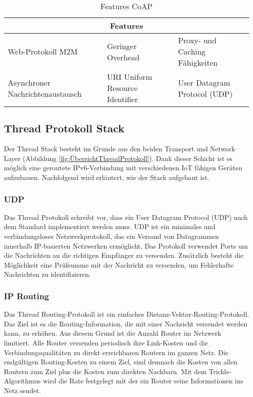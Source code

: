 \begin{table}[H]
	\centering
	\begin{adjustbox}{width=1\textwidth}
		\begin{tabular}{@{}|l|l|l|@{}}
			\toprule
			\multicolumn{3}{|c|}{\textbf{Features}}                                                             \\ \midrule
			Web-Protokoll M2M                & Geringer Overhead               & Proxy- und Caching Fähigkeiten \\ \midrule
			Asynchroner Nachrichtenaustausch & URI Uniform Resource Identifier & User Datagram  Protocol  (UDP) \\ \bottomrule
		\end{tabular}
	\end{adjustbox}
	\caption{Features CoAP}
	\label{table:FeaturesCoAP}
\end{table}
\newpage


\subsection{Thread Protokoll Stack}\label{subsec:ThreadProtokollStack}
Der Thread Stack besteht im Grunde aus den beiden Transport und Network Layer (Abbildung \ref{fig:ÜbersichtThreadProtokoll}). Dank dieser Schicht ist es möglich eine geroutete IPv6-Verbindung mit verschiedenen IoT fähigen Geräten aufzubauen. Nachfolgend wird erläutert, wie der Stack aufgebaut ist.

\subsubsection{UDP}\label{subsubsec:UDP}
Das Thread Protokoll schreibt vor, dass ein User Datagram Protocol (UDP) nach dem Standard \cite{postel_user_1980} implementiert werden muss. UDP ist ein minimales und verbindungsloses Netzwerkprotokoll, das ein Versand von Datagrammen innerhalb IP-basierten Netzwerken ermöglicht. Das Protokoll verwendet Ports um die Nachrichten an die richtigen Empfänger zu versenden. Zusätzlich besteht die Möglichkeit eine Prüfsumme mit der Nachricht zu versenden, um Fehlerhafte Nachrichten zu identifizieren. \cite[Seite 6-2]{thread_group_inc_thread_2017}

\subsubsection{IP Routing}\label{subsubsec:IPRouting}
Das Thread Routing-Protokoll ist ein einfaches Distanz-Vektor-Routing-Protokoll. Das Ziel ist es die Routing-Information, die mit einer Nachricht versendet werden kann, zu erhöhen. Aus diesem Grund ist die Anzahl Router im Netzwerk limitiert. Alle Router versenden periodisch ihre Link-Kosten und die Verbindungsqualitäten zu direkt erreichbaren Routern im ganzen Netz. Die endgültigen Routing-Kosten zu einem Ziel, sind demnach die Kosten von allen Routern zum Ziel plus die Kosten zum direkten Nachbarn. Mit dem Trickle-Algorithmus \cite{levis_trickle_2011} wird die Rate festgelegt mit der ein Router seine Informationen ins Netz sendet. \cite[Seite 5-23]{thread_group_inc_thread_2017}

